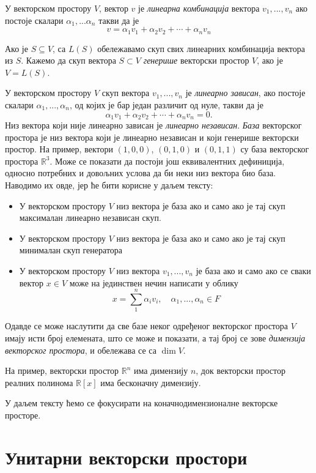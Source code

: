 \documentclass{report}
\theoremstyle{plain}
\theoremstyle{definition}
\begin{document}
У векторском простору $V$, вектор $v$ је \emph{линеарна комбинација} вектора $v_1, ..., v_n$ ако постоје скалари $\alpha_1, ...\alpha_n$ такви да је $$v = \alpha_1 v_1+ \alpha_2 v_2+ \cdots+\alpha_n v_n$$

Ако је $S\subseteq V$, са $L(S)$ обележавамо скуп свих линеарних комбинација вектора из $S$. Кажемо да скуп вектора $S\subset V$ \emph{генерише} векторски простор $V$, ако је $V = L(S)$.

У векторском простору $V$ скуп вектора $v_1, ...,v_n$ је \emph{линеарно зависан}, ако постоје скалари $\alpha_1, ...,\alpha_n$, од којих је бар један различит од нуле, такви да је $$\alpha_1 v_1 + \alpha_2 v_2 + \cdots+\alpha_n v_n = 0.$$ Низ вектора који није линеарно зависан је \emph{линеарно независан}.
\emph{База} векторског простора је низ вектора који је линеарно независан и који генерише векторски простор.
На пример, вектори $(1, 0, 0)$, $(0, 1, 0)$ и $(0, 1, 1)$ су база векторског простора $\mathbb{R}^3$.
Може се показати да постоји још еквивалентних дефиниција, односно потребних и довољних услова да би неки низ вектора био база. Наводимо их овде, јер ће бити корисне у даљем тексту:
\begin{itemize}
  \item У векторском простору $V$ низ вектора је база ако и само ако је тај скуп максималан линеарно независан скуп.
  \item У векторском простору $V$ низ вектора је база ако и само ако је тај скуп минималан скуп генератора
  \item У векторском простору $V$ низ вектора $v_1, ..., v_n$ је база ако и само ако се сваки вектор $x\in V$ може на јединствен нечин написати у облику $$x = \sum_1^n\alpha_i v_i, \quad \alpha_1, ..., \alpha_n\in F$$
\end{itemize}
Одавде се може наслутити да све базе неког одређеног векторског простора $V$ имају исти број елемената, што се може и показати, а тај број се зове \emph{димензија векторског простора}, и обележава се са $\operatorname{dim} V$.

На пример, векторски простор $\mathbb{R}^n$ има димензију $n$, док векторски простор реалних полинома $\mathbb{R}[x]$ има бесконачну димензију.

У даљем тексту ћемо се фокусирати на коначнодимензионалне векторске просторе.

\section{Унитарни векторски простори}
\end{document}
